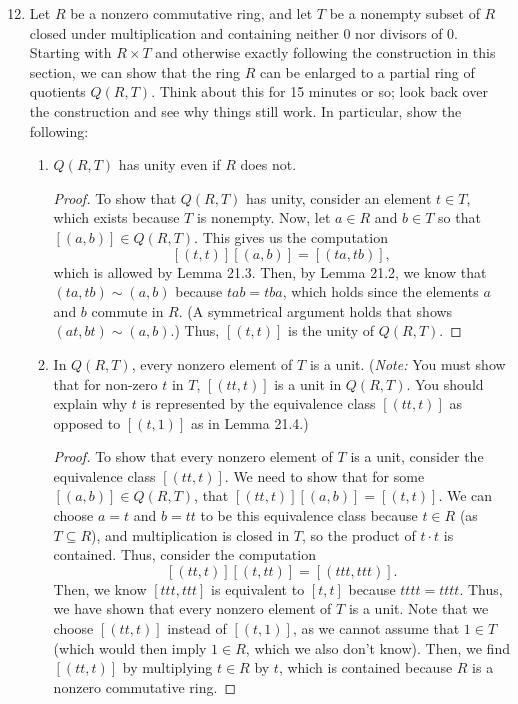 \documentclass[12pt, oneside]{book}
\newcommand{\pf}[1]{
    \begin{customframedproof}[linecolor=orangehdx!75]
        \begin{proof}
        #1
        \end{proof}
    \end{customframedproof}
}
\begin{document}
\begin{enumerate}
    \setcounter{enumi}{11}
    \item Let \(R\) be a nonzero commutative ring, and let \(T\) be a nonempty subset of \(R\) closed under multiplication and containing neither 0 nor divisors of 0. Starting with \(R \times T\) and otherwise exactly following the construction in this section, we can show that the ring \(R\) can be enlarged to a partial ring of quotients \(Q(R, T)\). Think about this for 15 minutes or so; look back over the construction and see why things still work. In particular, show the following:
          \begin{enumerate}
              \item \(Q(R, T)\) has unity even if \(R\) does not.
                    \pf{
                        To show that \(Q(R,T)\) has unity, consider an element \(t \in T\), which exists because \(T\) is nonempty. Now, let \(a \in R\) and \(b \in T\) so that \([(a,b)] \in Q(R,T)\). This gives us the computation
                        \[
                            [(t,t)][(a,b)] = [(ta, tb)],
                        \]
                        which is allowed by Lemma 21.3. Then, by Lemma 21.2, we know that \((ta, tb) \sim (a,b)\) because \(tab = tba\), which holds since the elements \(a\) and \(b\) commute in \(R\). (A symmetrical argument holds that shows \((at, bt) \sim (a,b)\).) Thus, \([(t,t)]\) is the unity of \(Q(R,T)\).
                    }
              \item In \(Q(R, T)\), every nonzero element of \(T\) is a unit. (\textit{Note:} You must show that for non-zero \(t\) in \(T\), \([(tt, t)]\) is a unit in \(Q(R,T)\). You should explain why \(t\) is represented by the equivalence class \([(tt, t)]\) as opposed to \([(t, 1)]\) as in Lemma 21.4.)
                    \pf{
                        To show that every nonzero element of \(T\) is a unit, consider the equivalence class \([(tt,t)]\). We need to show that for some \([(a,b)] \in Q(R,T)\), that \([(tt,t)][(a,b)] = [(t,t)]\). We can choose \(a = t\) and \(b = tt\) to be this equivalence class because \(t \in R\) (as \(T \subseteq R\)), and multiplication is closed in \(T\), so the product of \(t\cdot t\) is contained. Thus, consider the computation
                        \[
                            [(tt,t)][(t,tt)] = [(ttt,ttt)].
                        \]
                        Then, we know \([ttt,ttt]\) is equivalent to \([t,t]\) because \(tttt = tttt\). Thus, we have shown that every nonzero element of \(T\) is a unit. Note that we choose \([(tt,t)]\) instead of \([(t,1)]\), as we cannot assume that \(1 \in T\) (which would then imply \(1 \in R\), which we also don't know). Then, we find \([(tt,t)]\) by multiplying \(t \in R\) by \(t\), which is contained because \(R\) is a nonzero commutative ring. 
}
\end{enumerate}
\end{enumerate}
\end{document}
